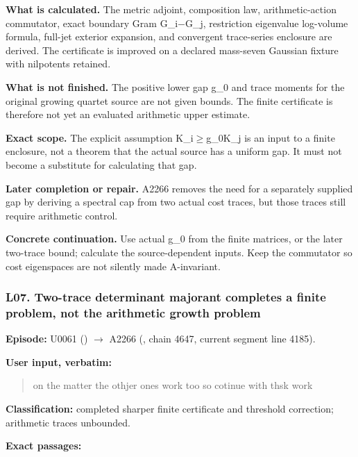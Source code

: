 \textbf{What is calculated.} The metric adjoint, composition law,
arithmetic-action commutator, exact boundary Gram
G\_i\allowbreak{}\ensuremath{−}\allowbreak{}G\_j, restriction eigenvalue
log-volume formula, full-jet exterior expansion, and convergent
trace-series enclosure are derived. The certificate is improved on a
declared mass-seven Gaussian fixture with nilpotents retained.

\textbf{What is not finished.} The positive lower gap g\_0 and trace
moments for the original growing quartet source are not given bounds.
The finite certificate is therefore not yet an evaluated arithmetic
upper estimate.

\textbf{Exact scope.} The explicit assumption
K\_i\allowbreak{}\ensuremath{≥}\allowbreak{}g\_0K\_j is an input to a
finite enclosure, not a theorem that the actual source has a uniform
gap. It must not become a substitute for calculating that gap.

\textbf{Later completion or repair.} A2266 removes the need for a
separately supplied gap by deriving a spectral cap from two actual cost
traces, but those traces still require arithmetic control.

\textbf{Concrete continuation.} Use actual g\_0 from the finite
matrices, or the later two-trace bound; calculate the source-dependent
inputs. Keep the commutator so cost eigenspaces are not silently made
A-invariant.

\subsubsection{L07. Two-trace determinant majorant completes a finite
problem, not the arithmetic growth
problem}\label{l07.-two-trace-determinant-majorant-completes-a-finite-problem-not-the-arithmetic-growth-problem}

\textbf{Episode:} U0061
(\protect{})
\allowbreak{}\ensuremath{→}\allowbreak{} A2266
(\protect{}, chain 4647,
current segment line 4185).

\textbf{User input, verbatim:}

\begin{quote}
on the matter the othjer ones work too so cotinue with thsk work
\end{quote}

\textbf{Classification:} completed sharper finite certificate and
threshold correction; arithmetic traces unbounded.

\textbf{Exact passages:}

